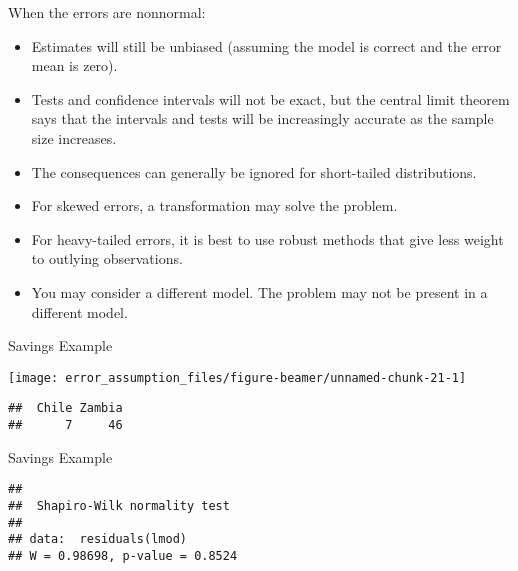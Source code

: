 \begin{frame}{When the errors are nonnormal:}
\protect\hypertarget{when-the-errors-are-nonnormal}{}
\begin{itemize}
\tightlist
\item
  Estimates will still be unbiased (assuming the model is correct and
  the error mean is zero).
\item
  Tests and confidence intervals will not be exact, but the central
  limit theorem says that the intervals and tests will be increasingly
  accurate as the sample size increases.
\item
  The consequences can generally be ignored for short-tailed
  distributions.
\item
  For skewed errors, a transformation may solve the problem.
\item
  For heavy-tailed errors, it is best to use robust methods that give
  less weight to outlying observations.
\item
  You may consider a different model. The problem may not be present in
  a different model.
\end{itemize}
\end{frame}

\begin{frame}[fragile]{Savings Example}
\protect\hypertarget{savings-example-2}{}
\begin{Shaded}
\begin{Highlighting}[]
\end{Highlighting}
\end{Shaded}

\begin{center}\texttt{[image: error\_assumption\_files/figure-beamer/unnamed-chunk-21-1]} \end{center}

\begin{verbatim}
##  Chile Zambia 
##      7     46
\end{verbatim}
\end{frame}

\begin{frame}[fragile]{Savings Example}
\protect\hypertarget{savings-example-3}{}
\begin{Shaded}
\begin{Highlighting}[]
\NormalTok{(}
\end{Highlighting}
\end{Shaded}

\begin{verbatim}
## 
##  Shapiro-Wilk normality test
## 
## data:  residuals(lmod)
## W = 0.98698, p-value = 0.8524
\end{verbatim}
\end{frame}

